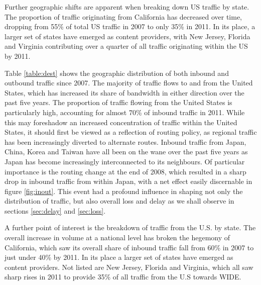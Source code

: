 Further geographic shifts are apparent when breaking down US traffic by state.
The proportion of traffic originating from California has decreased over time, dropping from 55\% of total US traffic in 2007 to only 35\% in 2011.
In its place, a larger set of states have emerged as content providers, with New Jersey, Florida and Virginia contributing over a quarter of all traffic originating within the US by 2011.


Table \ref{table:dest} shows the geographic distribution of both inbound and outbound traffic since 2007. The majority of traffic flows to and from the United States, which has increased its share of bandwidth in either direction over the past five years. The proportion of traffic flowing from the United States is particularly high, accounting for almost 70\% of inbound traffic in 2011. While this may foreshadow an increased concentration of traffic within the United States, it should first be viewed as a reflection of routing policy, as regional traffic has been increasingly diverted to alternate routes. Inbound traffic from Japan, China, Korea and Taiwan have all been on the wane over the past five years as Japan has become increasingly interconnected to its neighbours. Of particular importance is the routing change at the end of 2008, which resulted in a sharp drop in inbound traffic from within Japan, with a net effect easily discernable in figure \ref{fig:inout}. This event had a profound influence in shaping not only the distribution of traffic, but also overall loss and delay as we shall observe in sections \ref{sec:delay} and \ref{sec:loss}.

A further point of interest is the breakdown of traffic from the U.S. by state. The overall increase in volume at a national level has broken the hegemony of California, which saw its overall share of inbound traffic fall from 60\% in 2007 to just under 40\% by 2011. In its place a larger set of states have emerged as content providers. Not listed are New Jersey, Florida and Virginia, which all saw sharp rises in 2011 to provide 35\% of all traffic from the U.S towards WIDE.
    
